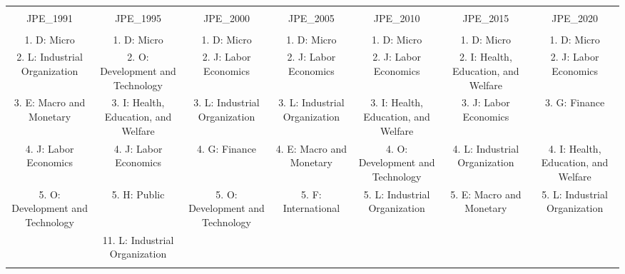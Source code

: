 
\begin{table}[!htbp] \centering 
  \caption{} 
  \label{} 
\scriptsize 
\begin{tabular}{@{\extracolsep{5pt}} ccccccc} 
\\[-1.8ex]\hline 
\hline \\[-1.8ex] 
JPE\_1991 & JPE\_1995 & JPE\_2000 & JPE\_2005 & JPE\_2010 & JPE\_2015 & JPE\_2020 \\ 
\hline \\[-1.8ex] 
1. D: Micro & 1. D: Micro & 1. D: Micro & 1. D: Micro & 1. D: Micro & 1. D: Micro & 1. D: Micro \\ 
2. L: Industrial Organization & 2. O: Development and Technology & 2. J: Labor Economics & 2. J: Labor Economics & 2. J: Labor Economics & 2. I: Health, Education, and Welfare & 2. J: Labor Economics \\ 
3. E: Macro and Monetary & 3. I: Health, Education, and Welfare & 3. L: Industrial Organization & 3. L: Industrial Organization & 3. I: Health, Education, and Welfare & 3. J: Labor Economics & 3. G: Finance \\ 
4. J: Labor Economics & 4. J: Labor Economics & 4. G: Finance & 4. E: Macro and Monetary & 4. O: Development and Technology & 4. L: Industrial Organization & 4. I: Health, Education, and Welfare \\ 
5. O: Development and Technology & 5. H: Public & 5. O: Development and Technology & 5. F: International & 5. L: Industrial Organization & 5. E: Macro and Monetary & 5. L: Industrial Organization \\ 
 & 11. L: Industrial Organization &  &  &  &  &  \\ 
\hline \\[-1.8ex] 
\end{tabular} 
\end{table} 
